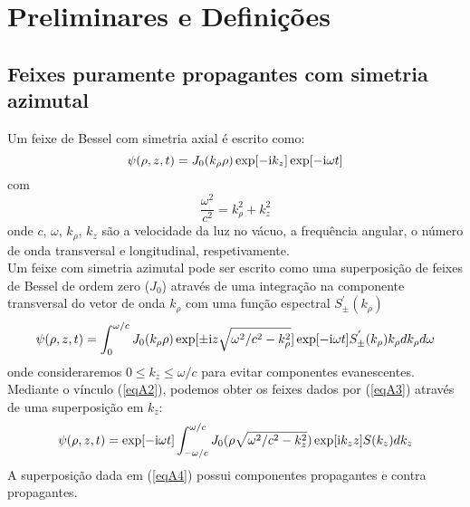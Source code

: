 \chapter{Preliminares e Defini\c{c}\~{o}es}
\section{Feixes puramente propagantes com simetria azimutal}
Um feixe de Bessel com simetria axial \'e escrito como:
 \begin{equation}\label{eqA1}
    \psi(\rho,z,t)= J_0(k_\rho\rho)\exp[{-\rm i}k_z]\exp[{-\rm i}\omega t]
\end{equation}
com
\begin{equation}\label{eqA2}
    \frac{\omega^2}{c^2}= k^2_{\rho} + k^2_{z}
\end{equation}
onde $c$, $\omega$, $k_{\rho}$, $k_{z}$ são a velocidade da luz no vácuo, a frequência angular, o número de onda transversal e longitudinal, respetivamente.\\
Um feixe com simetria azimutal pode ser escrito como  uma superposição de feixes de Bessel de ordem zero ($J_0$) através de uma integração na componente transversal do vetor de onda $ k_{{\rho}} $ com uma função espectral $S_{\pm}^{'}(k_{\rho})$ %
\begin{equation}\label{eqA3}
\psi(\rho,z,t)=
\int_{0}^{\omega/c}J_0(k_{\rho}\rho)\exp[\pm{\rm i}z\sqrt{\omega^2/c^2-k^{2}_{\rho}}]
\exp[{-\rm i}\omega t]S_{\pm}^{'}(k_{\rho})k_{\rho}dk_{\rho}d\omega
\end{equation}
 onde consideraremos $0\leq k_z\leq \omega /c$ para evitar componentes evanescentes.\\
Mediante o vínculo (\ref{eqA2}), podemos obter os feixes dados por (\ref{eqA3}) através de uma superposição em $k_z$:
\begin{equation}\label{eqA4}
\psi(\rho,z,t)=
\exp[{-\rm i}\omega t]\int_{-\omega/c}^{\omega/c}J_0(\rho\sqrt{\omega^2/c^2-k^{2}_{z}})\exp[{\rm i}k_z z]S(k_{z})dk_{z}
\end{equation} 
A superposição dada em (\ref{eqA4}) possui componentes propagantes e contra propagantes.
